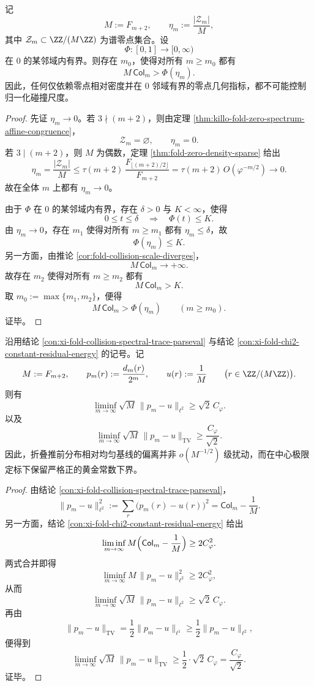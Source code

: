 \begin{theorem}[零点相对密度永远不是碰撞尺度的充分统计量]\label{thm:xi-time-part66-zero-density-never-sufficient}
记
\[
M:=F_{m+2},
\qquad
\eta_m:=\frac{|\mathcal Z_m|}{M},
\]
其中 \(\mathcal Z_m\subset \ZZ/(M\ZZ)\) 为谱零点集合。设
\[
\Phi:[0,1]\to [0,\infty)
\]
在 \(0\) 的某邻域内有界。则存在 \(m_0\)，使得对所有 \(m\ge m_0\) 都有
\[
\boxed{\;
M\,\mathsf{Col}_m>\Phi(\eta_m).\;}
\]
因此，任何仅依赖零点相对密度并在 \(0\) 邻域有界的零点几何指标，都不可能控制归一化碰撞尺度。
\end{theorem}
\begin{proof}
先证 \(\eta_m\to 0\)。若 \(3\nmid (m+2)\)，则由定理
\ref{thm:killo-fold-zero-spectrum-affine-congruence}，
\[
\mathcal Z_m=\varnothing,
\qquad
\eta_m=0.
\]
若 \(3\mid (m+2)\)，则 \(M\) 为偶数，定理 \ref{thm:fold-zero-density-sparse} 给出
\[
\eta_m=\frac{|\mathcal Z_m|}{M}
\le
\tau(m+2)\,\frac{F_{\lfloor (m+2)/2\rfloor}}{F_{m+2}}
=
\tau(m+2)\,O(\varphi^{-m/2})\to 0.
\]
故在全体 \(m\) 上都有 \(\eta_m\to 0\)。

由于 \(\Phi\) 在 \(0\) 的某邻域内有界，存在 \(\delta>0\) 与 \(K<\infty\)，使得
\[
0\le t\le \delta\quad\Longrightarrow\quad \Phi(t)\le K.
\]
由 \(\eta_m\to 0\)，存在 \(m_1\) 使得对所有 \(m\ge m_1\) 都有 \(\eta_m\le \delta\)，故
\[
\Phi(\eta_m)\le K.
\]
另一方面，由推论 \ref{cor:fold-collision-scale-diverges}，
\[
M\,\mathsf{Col}_m\longrightarrow +\infty.
\]
故存在 \(m_2\) 使得对所有 \(m\ge m_2\) 都有
\[
M\,\mathsf{Col}_m>K.
\]
取 \(m_0:=\max\{m_1,m_2\}\)，便得
\[
M\,\mathsf{Col}_m>\Phi(\eta_m)
\qquad (m\ge m_0).
\]
证毕。
\end{proof}

\begin{theorem}\label{thm:xi-time-part66-uniform-baseline-sqrtM-rigidity}
沿用结论 \ref{con:xi-fold-collision-spectral-trace-parseval} 与结论
\ref{con:xi-fold-chi2-constant-residual-energy} 的记号。记
\[
M:=F_{m+2},
\qquad
p_m(r):=\frac{d_m(r)}{2^m},
\qquad
u(r):=\frac{1}{M}
\qquad
\bigl(r\in \ZZ/(M\ZZ)\bigr).
\]
则有
\[
\boxed{\;
\liminf_{m\to\infty}\sqrt{M}\,\|p_m-u\|_{\ell^2}
\ge
\sqrt{2}\,C_\varphi.\;}
\]
以及
\[
\boxed{\;
\liminf_{m\to\infty}\sqrt{M}\,\|p_m-u\|_{\mathrm{TV}}
\ge
\frac{C_\varphi}{\sqrt{2}}.\;}
\]
因此，折叠推前分布相对均匀基线的偏离并非 \(o(M^{-1/2})\) 级扰动，而在中心极限定标下保留严格正的黄金常数下界。
\end{theorem}
\begin{proof}
由结论 \ref{con:xi-fold-collision-spectral-trace-parseval}，
\[
\|p_m-u\|_{\ell^2}^2
:=
\sum_{r}\bigl(p_m(r)-u(r)\bigr)^2
=
\mathsf{Col}_m-\frac1M.
\]
另一方面，结论 \ref{con:xi-fold-chi2-constant-residual-energy} 给出
\[
\liminf_{m\to\infty}M\Bigl(\mathsf{Col}_m-\frac1M\Bigr)\ge 2C_\varphi^2.
\]
两式合并即得
\[
\liminf_{m\to\infty}M\,\|p_m-u\|_{\ell^2}^2\ge 2C_\varphi^2,
\]
从而
\[
\liminf_{m\to\infty}\sqrt{M}\,\|p_m-u\|_{\ell^2}\ge \sqrt2\,C_\varphi.
\]
再由
\[
\|p_m-u\|_{\mathrm{TV}}
=
\frac12\|p_m-u\|_{\ell^1}
\ge
\frac12\|p_m-u\|_{\ell^2},
\]
便得到
\[
\liminf_{m\to\infty}\sqrt{M}\,\|p_m-u\|_{\mathrm{TV}}
\ge
\frac{1}{2}\cdot \sqrt2\,C_\varphi
=
\frac{C_\varphi}{\sqrt2}.
\]
证毕。
\end{proof}

